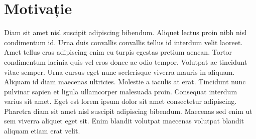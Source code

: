 \chapter*{Motivație} 

Diam sit amet nisl suscipit adipiscing bibendum. Aliquet lectus proin nibh nisl condimentum id. Urna duis convallis convallis 
tellus id interdum velit laoreet. Amet tellus cras adipiscing enim eu turpis egestas pretium aenean. Tortor condimentum lacinia 
quis vel eros donec ac odio tempor. Volutpat ac tincidunt vitae semper. Urna cursus eget nunc scelerisque viverra mauris in aliquam. 
Aliquam id diam maecenas ultricies. Molestie a iaculis at erat. Tincidunt nunc pulvinar sapien et ligula ullamcorper malesuada proin. 
Consequat interdum varius sit amet. Eget est lorem ipsum dolor sit amet consectetur adipiscing. Pharetra diam sit amet nisl suscipit 
adipiscing bibendum. Maecenas sed enim ut sem viverra aliquet eget sit. Enim blandit volutpat maecenas volutpat blandit aliquam etiam 
erat velit.